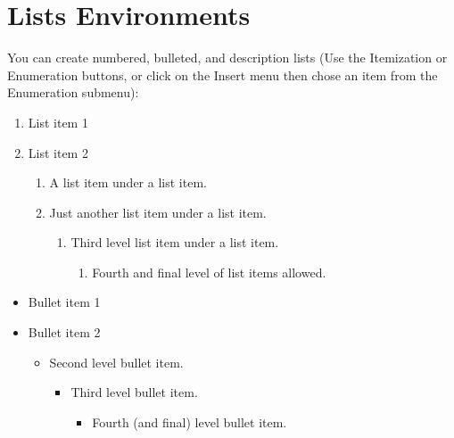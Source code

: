 \documentclass[a4paper]{book}%
\begin{document}
\section{Lists Environments}

You can create numbered, bulleted, and description lists
(Use the Itemization or Enumeration buttons, or click on the Insert menu
then chose an item from the Enumeration submenu):

\begin{enumerate}
\item List item 1

\item List item 2

\begin{enumerate}
\item A list item under a list item.

\item Just another list item under a list item.

\begin{enumerate}
\item Third level list item under a list item.

\begin{enumerate}
\item Fourth and final level of list items allowed.
\end{enumerate}
\end{enumerate}
\end{enumerate}
\end{enumerate}

\begin{itemize}
\item Bullet item 1

\item Bullet item 2

\begin{itemize}
\item Second level bullet item.

\begin{itemize}
\item Third level bullet item.

\begin{itemize}
\item Fourth (and final) level bullet item.
\end{itemize}
\end{itemize}
\end{itemize}
\end{itemize}
\end{document}

